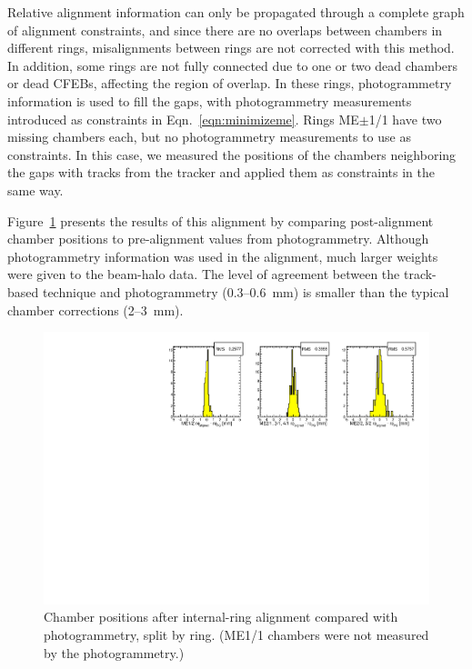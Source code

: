 \documentclass[12pt]{article}
\begin{document}
Relative alignment information can only be propagated through a
complete graph of alignment constraints, and since there are no
overlaps between chambers in different rings, misalignments between
rings are not corrected with this method.  In addition, some rings are
not fully connected due to one or two dead chambers or dead CFEBs,
affecting the region of overlap.  In these rings, photogrammetry
information is used to fill the gaps, with photogrammetry measurements
introduced as constraints in Eqn.~\ref{eqn:minimizeme}.  Rings
ME$\pm$1/1 have two missing chambers each, but no photogrammetry
measurements to use as constraints.  In this case, we measured the
positions of the chambers neighboring the gaps with tracks from the
tracker and applied them as constraints in the same way.

Figure~\ref{fig:aligned_minus_pg} presents the results of this
alignment by comparing post-alignment chamber positions to
pre-alignment values from photogrammetry.  Although photogrammetry
information was used in the alignment, much larger weights were given
to the beam-halo data.  The level of agreement between the track-based
technique and photogrammetry (0.3--0.6~mm) is smaller than the typical
chamber corrections (2--3~mm).

\begin{figure}
\includegraphics[width=\linewidth]{aligned_minus_pg.pdf}

\caption{Chamber positions after internal-ring alignment compared
  with photogrammetry, split by ring.  (ME1/1 chambers were not
  measured by the photogrammetry.) \label{fig:aligned_minus_pg}}
\end{figure}
\end{document}
